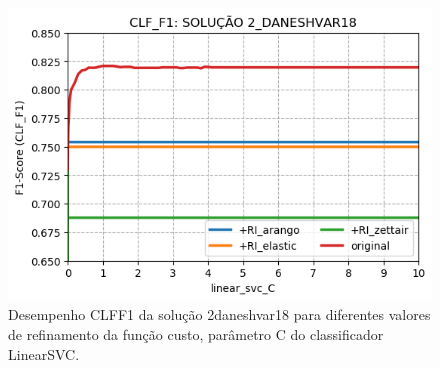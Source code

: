 \begin{figure}[ht]
    \centering
    \caption{Desempenho CLF\underscore{}F1 da solução 2\underscore{}daneshvar18 para diferentes valores de refinamento da função custo, parâmetro C do classificador LinearSVC.}
    \vspace{-0.5cm}
    \begin{center}
        \includegraphics[scale=0.75]{img/clf-f1-2-daneshvar18.png}
    \end{center}
    \vspace{-0.5cm}
    \label{fig:clf-f1-2-daneshvar18}
\end{figure}